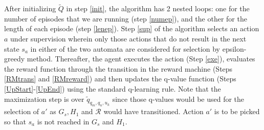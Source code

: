 \documentclass[letterpaper, 10 pt, conference]{ieeeconf}
\begin{document}
After initializing $\widetilde{Q}$ in step \ref{init}, the algorithm has 2 nested loops: one for the number of episodes that we are running (step \ref{numep}), and the other for the length of each episode (step \ref{lenep}). Step \ref{sup} of the algorithm selects an action $a$ under supervision wherein only those actions that do not result in the next state $s_a$ in either of the two automata are considered for selection by epsilon-greedy method. Thereafter, the agent executes the action (Step \ref{exe}), evaluates the reward function through the transition in the reward machine (Steps \ref{RMtrans} and \ref{RMreward}) and then updates the q-value function (Steps \ref{UpStart}-\ref{UpEnd}) using the standard q-learning rule. Note that the maximization step is over $\widetilde{q}_{q_m, q_n, u_k}$ since those q-values would be used for the selection of $a'$ as $G_s, H_1$ and $\mathcal{R}$ would have transitioned. Action $a'$ is to be picked so that $s_a$ is not reached in $G_s$ and $H_1$.


\end{document}

